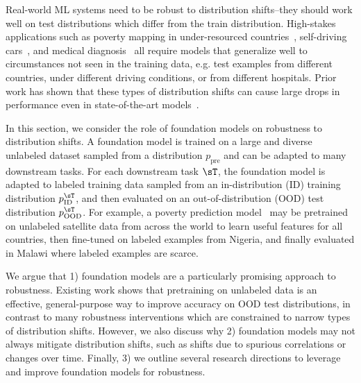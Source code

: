 Real-world ML systems need to be robust to distribution shifts--they should work well on test distributions which differ from the train distribution. High-stakes applications such as poverty mapping in under-resourced countries~\citep{xie2016transfer,jean2016combining}, self-driving cars~\citep{yu2020bdd100k,sun2020scalability}, and medical diagnosis~\citep{ albadawy2018tumor,dai2018dark} all require models that generalize well to circumstances not seen in the training data, e.g. test examples from different countries, under different driving conditions, or from different hospitals. Prior work has shown that these types of distribution shifts can cause large drops in performance even in state-of-the-art models~\citep{blitzer2006domain,daume07easyadapt,sugiyama2007covariate,ganin2015domain,peng2019moment,kumar2020gradual,arjovsky2019invariant,szegedy2014intriguing,hendrycks2019benchmarking,sagawa2020group,recht2019doimagenet,abney2007semisup,ruder2018strong,geirhos2018generalisation,kumar2020conservative,yu2020mopo,geirhos2020shortcut,xie2021innout,koh2021wilds}. 

\newcommand\ppre{p_{\text{pre}}}
\newcommand\ptrain{p^{\sT}_{\text{ID}}}
\newcommand\ptest{p^{\sT}_{\text{OOD}}}

In this section, we consider the role of foundation models on robustness to distribution shifts. A foundation model is trained on a large and diverse unlabeled dataset sampled from a distribution $\ppre$ and can be adapted to many downstream tasks. For each downstream task $\sT$, the foundation model is adapted to labeled training data sampled from an in-distribution (ID) training distribution $\ptrain$, and then evaluated on an out-of-distribution (OOD) test distribution $\ptest$.
For example, a poverty prediction model~\citep{xie2016transfer,jean2016combining} may be pretrained on unlabeled satellite data from across the world to learn useful features for all countries, then fine-tuned on labeled examples from Nigeria, and finally evaluated in Malawi where labeled examples are scarce.

We argue that 1) foundation models are a particularly promising approach to robustness. Existing work shows that pretraining on unlabeled data is an effective, general-purpose way to improve accuracy on OOD test distributions, in contrast to many robustness interventions which are constrained to narrow types of distribution shifts. However, we also discuss why 2) foundation models may not always mitigate distribution shifts, such as shifts due to spurious correlations or changes over time. Finally, 3) we outline several research directions to leverage and improve foundation models for robustness.

